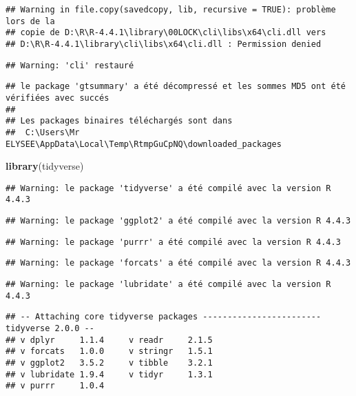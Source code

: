 \documentclass[
]{article}
\newenvironment{Shaded}{\begin{snugshade}}{\end{snugshade}}
\newcommand{\FunctionTok}[1]{\textcolor[rgb]{0.13,0.29,0.53}{\textbf{#1}}}
\newcommand{\NormalTok}[1]{#1}
\begin{document}
\begin{verbatim}
## Warning in file.copy(savedcopy, lib, recursive = TRUE): problème lors de la
## copie de D:\R\R-4.4.1\library\00LOCK\cli\libs\x64\cli.dll vers
## D:\R\R-4.4.1\library\cli\libs\x64\cli.dll : Permission denied
\end{verbatim}

\begin{verbatim}
## Warning: 'cli' restauré
\end{verbatim}

\begin{verbatim}
## le package 'gtsummary' a été décompressé et les sommes MD5 ont été vérifiées avec succés
## 
## Les packages binaires téléchargés sont dans
##  C:\Users\Mr ELYSEE\AppData\Local\Temp\RtmpGuCpNQ\downloaded_packages
\end{verbatim}

\begin{Shaded}
\begin{Highlighting}[]
\FunctionTok{library}\NormalTok{(tidyverse)}
\end{Highlighting}
\end{Shaded}

\begin{verbatim}
## Warning: le package 'tidyverse' a été compilé avec la version R 4.4.3
\end{verbatim}

\begin{verbatim}
## Warning: le package 'ggplot2' a été compilé avec la version R 4.4.3
\end{verbatim}

\begin{verbatim}
## Warning: le package 'purrr' a été compilé avec la version R 4.4.3
\end{verbatim}

\begin{verbatim}
## Warning: le package 'forcats' a été compilé avec la version R 4.4.3
\end{verbatim}

\begin{verbatim}
## Warning: le package 'lubridate' a été compilé avec la version R 4.4.3
\end{verbatim}

\begin{verbatim}
## -- Attaching core tidyverse packages ------------------------ tidyverse 2.0.0 --
## v dplyr     1.1.4     v readr     2.1.5
## v forcats   1.0.0     v stringr   1.5.1
## v ggplot2   3.5.2     v tibble    3.2.1
## v lubridate 1.9.4     v tidyr     1.3.1
## v purrr     1.0.4
\end{verbatim}
\end{document}
